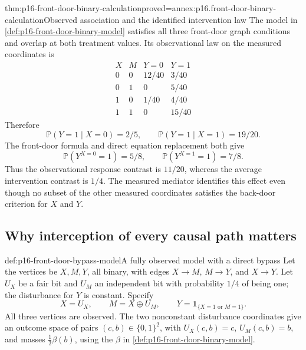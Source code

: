 \begin{hbtheorem}{thm:p16-front-door-binary-calculation}{proved=annex:p16.front-door-binary-calculation}{Observed association and the identified intervention law}
The model in \cref{def:p16-front-door-binary-model} satisfies all
three front-door graph conditions and overlap at both treatment values.
Its observational law on the measured coordinates is
\[
\begin{array}{cc|cc}
 X&M&Y=0&Y=1\\\hline
 0&0&12/40&3/40\\
 0&1&0&5/40\\
 1&0&1/40&4/40\\
 1&1&0&15/40
\end{array}
\]
Therefore
\[
 \mathbb P(Y=1\mid X=0)=2/5,\qquad
 \mathbb P(Y=1\mid X=1)=19/20.
\]
The front-door formula and direct equation replacement both give
\[
 \mathbb P(Y^{X=0}=1)=5/8,\qquad
 \mathbb P(Y^{X=1}=1)=7/8.
\]
Thus the observational response contrast is \(11/20\), whereas
the average intervention contrast is \(1/4\). The measured mediator
identifies this effect even though no subset of the other measured
coordinates satisfies the back-door criterion for \(X\) and \(Y\).
\end{hbtheorem}

\subsection{Why interception of every causal path matters}

\begin{hbdefinition}{def:p16-front-door-bypass-model}{A fully observed model with a direct bypass}
Let the vertices be \(X,M,Y\), all binary, with edges
\(X\to M\), \(M\to Y\), and \(X\to Y\). Let \(U_X\)
be a fair bit and \(U_M\) an independent bit with probability
\(1/4\) of being one; the disturbance for \(Y\) is constant.
Specify
\[
 X=U_X,\qquad M=X\oplus U_M,\qquad
 Y=\mathbf1_{\{X=1\text{ or }M=1\}}.
\]
All three vertices are observed. The two nonconstant disturbance
coordinates give an outcome space of pairs \((c,b)\in\{0,1\}^2\),
with \(U_X(c,b)=c\), \(U_M(c,b)=b\), and masses
\(\frac12\beta(b)\), using the \(\beta\) in
\cref{def:p16-front-door-binary-model}.
\end{hbdefinition}

